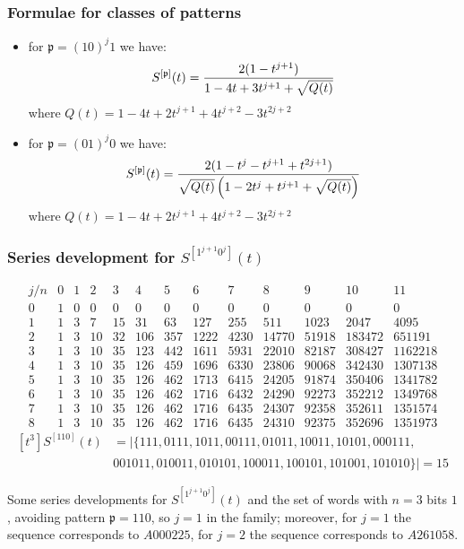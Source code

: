 \documentclass{beamer}
\begin{document}
\begin{frame}\frametitle{Formulae for classes of patterns}
{\small
\begin{itemize}

\item for $\mathfrak{p}=(10)^j1$ we have:
$$ S^{[\mathfrak{p}]}(t)={2 (1-t^{j+1})\over 1-4t+3t^{j+1}+\sqrt{Q(t)}}$$
where $Q(t)=1-4t+2t^{j+1}+4t^{j+2}-3t^{2j+2}$

\item for $\mathfrak{p}=(01)^j0$ we have:
$$ S^{[\mathfrak{p}]}(t)={2 (1-t^j-t^{j+1}+t^{2j+1})\over \sqrt{Q(t)} \left(1-2t^j+t^{j+1}+\sqrt{Q(t)}  \right)}$$
where $Q(t)={1-4t+2t^{j+1}+4t^{j+2}-3t^{2j+2}}$

\end{itemize}
}
\end{frame}

\begin{frame}\frametitle{Series development for $S^{[1^{j+1}0^{j}]}(t)$}
{\tiny
\begin{table}
\begin{equation*}\begin{array}{c|cccccccccccc}j/n & 0 & 1 & 2 & 3 & 4 & 5 & 6 & 7 & 8 & 9 & 10 & 11\\\hline0 & 1 & 0 & 0 & 0 & 0 & 0 & 0 & 0 & 0 & 0 & 0 & 0\\1 & 1 & 3 & 7 & 15 & 31 & 63 & 127 & 255 & 511 & 1023 & 2047 & 4095\\2 & 1 & 3 & 10 & 32 & 106 & 357 & 1222 & 4230 & 14770 & 51918 & 183472 & 651191\\3 & 1 & 3 & 10 & 35 & 123 & 442 & 1611 & 5931 & 22010 & 82187 & 308427 & 1162218\\4 & 1 & 3 & 10 & 35 & 126 & 459 & 1696 & 6330 & 23806 & 90068 & 342430 & 1307138\\5 & 1 & 3 & 10 & 35 & 126 & 462 & 1713 & 6415 & 24205 & 91874 & 350406 & 1341782\\6 & 1 & 3 & 10 & 35 & 126 & 462 & 1716 & 6432 & 24290 & 92273 & 352212 & 1349768\\7 & 1 & 3 & 10 & 35 & 126 & 462 & 1716 & 6435 & 24307 & 92358 & 352611 & 1351574\\8 & 1 & 3 & 10 & 35 & 126 & 462 & 1716 & 6435 & 24310 & 92375 & 352696 & 1351973\end{array}\end{equation*}
\begin{displaymath}
\begin{split}
[t^{3}]S^{[110]}(t) &= \big|\lbrace 111, 0111, 1011, 00111, 01011, 10011, 10101, 000111, \\
& 001011, 010011, 010101, 100011, 100101, 101001, 101010\rbrace\big| = 15
\end{split}
\end{displaymath}
\caption{Some series developments for $S^{[1^{j+1}0^j]}(t)$ and the set of
words with $n=3$ bits $1$, avoiding pattern $\mathfrak{p}=110$, so $j=1$ in the
family; moreover, for $j=1$ the sequence corresponds to $A000225$, for $j=2$ the
sequence corresponds to $A261058$.}
\end{table}
}
\end{frame}
\end{document}

